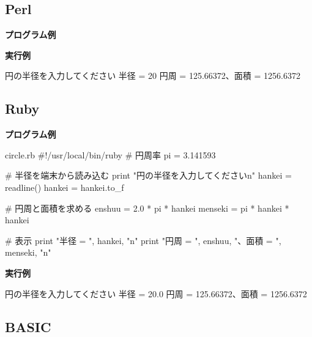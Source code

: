 \subsection{Perl}

\noindent
\textbf{プログラム例}


\noindent
\textbf{実行例}

\begin{progls}
円の半径を入力してください
半径 = 20
円周 = 125.66372、面積 = 1256.6372
%
\end{progls}

\subsection{Ruby}

\noindent
\textbf{プログラム例}

\begin{progls2}{circle.rb}
#!/usr/local/bin/ruby
# 円周率
pi = 3.141593

# 半径を端末から読み込む
print "円の半径を入力してください{\bcsl}n"
hankei = readline()
hankei = hankei.to_f

# 円周と面積を求める
enshuu = 2.0 * pi * hankei
menseki = pi * hankei * hankei

# 表示
print "半径 = ", hankei, "{\bcsl}n"
print "円周 = ", enshuu, "、面積 = ", menseki, "{\bcsl}n"
\end{progls2}

\noindent
\textbf{実行例}

\begin{progls}
円の半径を入力してください
半径 = 20.0
円周 = 125.66372、面積 = 1256.6372
%
\end{progls}

\subsection{BASIC}

